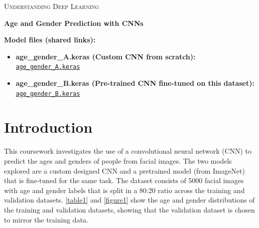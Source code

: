 \documentclass[11pt,a4paper]{article}
\newcommand{\unitname}{Understanding Deep Learning}
\newcommand{\modelAlink}{%
  \href{https://drive.google.com/file/d/1IopVGb6fbhNIXqgFGUXBufDDIlO_xU22/view?usp=drive_link}{\texttt{age\_gender\_A.keras}}%
}
\newcommand{\modelBlink}{%
  \href{https://drive.google.com/file/d/1ok4jF9eWFTqmg7UVxBWfj6GsbcN_gapG/view?usp=drive_link}{\texttt{age\_gender\_B.keras}}%
}
\begin{document}
\begin{titlepage}
    \thispagestyle{empty}
    \begin{center}
        \vspace*{2cm}
        
        {\Large \textsc{\unitname} \par}
        
        \vspace{1.5cm}
        
        {\Huge \bfseries Age and Gender Prediction with CNNs \par}
        
        
        \vspace{14cm}

        
        \begin{flushleft}
        \textbf{Model files (shared links):}
        \begin{itemize}
            \item \textbf{age\_gender\_A.keras (Custom CNN from scratch):}\\
            \modelAlink
            \item \textbf{age\_gender\_B.keras (Pre-trained CNN fine-tuned on this dataset):}\\
            \modelBlink
        \end{itemize}
        \end{flushleft}
        
    \end{center}
\end{titlepage}

\onehalfspacing


\section{Introduction} %
This coursework investigates the use of a convolutional neural network (CNN) to predict the ages and genders of people from facial images. The two models explored are a custom designed CNN and a pretrained model (from ImageNet) that is fine-tuned for the same task. The dataset consists of 5000 facial images with age and gender labels that is split in a 80:20 ratio across the training and validation datasets. \autoref{table1} and \autoref{figure1} show the age and gender distributions of the training and validation datasets, showing that the validation dataset is chosen to mirror the training data. 
\end{document}
